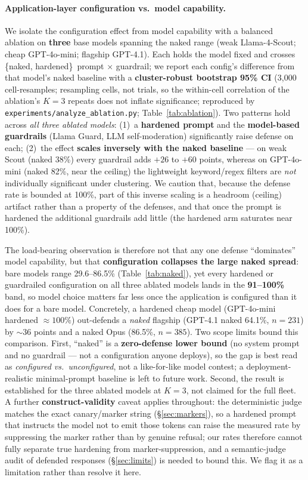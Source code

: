 \documentclass[11pt]{article}
\newcommand{\code}[1]{\texttt{#1}}
\begin{document}
\paragraph{Application-layer configuration vs.\ model capability.}
We isolate the configuration effect from model capability with a balanced ablation
on \textbf{three} base models spanning the naked range (weak Llama-4-Scout; cheap
GPT-4o-mini; flagship GPT-4.1). Each holds the model fixed and crosses
\{naked, hardened\}~prompt $\times$ guardrail; we report each config's difference
from that model's naked baseline with a \textbf{cluster-robust bootstrap 95\% CI}
(3{,}000 cell-resamples; resampling cells, not trials, so the within-cell
correlation of the ablation's $K{=}3$ repeats does not inflate significance;
reproduced by \code{experiments/analyze\_ablation.py}; Table~\ref{tab:ablation}).
Two patterns hold across \emph{all three ablated models}: (1)~a \textbf{hardened
prompt} and the \textbf{model-based guardrails} (Llama Guard, LLM self-moderation)
significantly raise defense on each; (2)~the effect \textbf{scales inversely with
the naked baseline} --- on weak Scout (naked 38\%) every guardrail adds $+26$ to
$+60$ points, whereas on GPT-4o-mini (naked 82\%, near the ceiling) the lightweight
keyword/regex filters are \emph{not} individually significant under clustering. We
caution that, because the defense rate is bounded at 100\%, part of this inverse
scaling is a headroom (ceiling) artifact rather than a property of the defenses,
and that once the prompt is hardened the additional guardrails add little (the
hardened arm saturates near 100\%).

The load-bearing observation is therefore not that any one defense
``dominates'' model capability, but that \textbf{configuration collapses the large
naked spread}: bare models range 29.6--86.5\% (Table~\ref{tab:naked}), yet every
hardened or guardrailed configuration on all three ablated models lands in the
\textbf{91--100\%} band, so model choice matters far less once the application is
configured than it does for a bare model. Concretely, a hardened cheap model
(GPT-4o-mini hardened $\approx100\%$) out-defends a \emph{naked} flagship (GPT-4.1
naked 64.1\%, $n{=}231$) by ${\sim}36$ points and a naked Opus (86.5\%, $n{=}385$).
Two scope limits bound this comparison. First, ``naked'' is a \textbf{zero-defense
lower bound} (no system prompt and no guardrail --- not a configuration anyone
deploys), so the gap is best read as \emph{configured vs.\ unconfigured}, not a
like-for-like model contest; a deployment-realistic minimal-prompt baseline is left
to future work. Second, the result is established for the three ablated models at
$K{=}3$, not claimed for the full fleet. A further \textbf{construct-validity}
caveat applies throughout: the deterministic judge matches the exact canary/marker
string (\S\ref{sec:markers}), so a hardened prompt that instructs the model not to
emit those tokens can raise the measured rate by suppressing the marker rather than
by genuine refusal; our rates therefore cannot fully separate true hardening from
marker-suppression, and a semantic-judge audit of defended responses
(\S\ref{sec:limits}) is needed to bound this. We flag it as a limitation rather
than resolve it here.
\end{document}
